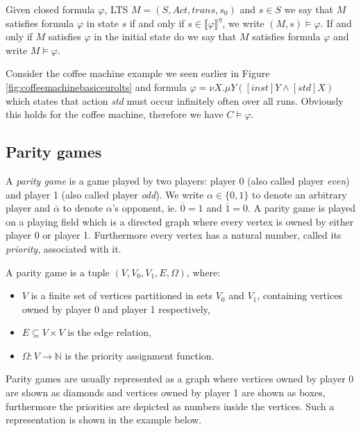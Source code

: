 Given closed formula $\varphi$, LTS $M = (S, Act, trans, s_0)$ and $s \in S$ we say that $M$ satisfies formula $\varphi$ in state $s$ if and only if $s \in \llbracket \varphi \rrbracket^\eta$, we write $(M,s) \models \varphi$. If and only if $M$ satisfies $\varphi$ in the initial state do we say that $M$ satisfies formula $\varphi$ and write $M \models \varphi$. 

\begin{example}
	Consider the coffee machine example we seen earlier in Figure \ref{fig:coffeemachinebasiceurolts} and formula $\varphi = \nu X. \mu Y([inst]Y \wedge [std]X)$ which states that action \textit{std} must occur infinitely often over all runs. Obviously this holds for the coffee machine, therefore we have $C \models \varphi$.
\end{example}

\subsection{Parity games}
A \textit{parity game} is a game played by two players: player 0 (also called player \textit{even}) and player 1 (also called player \textit{odd}). We write $\alpha \in \{0,1\}$ to denote an arbitrary player and $\overline{\alpha}$ to denote $\alpha$'s opponent, ie. $\overline{0} = 1$ and $\overline{1} = 0$. A parity game is played on a playing field which is a directed graph where every vertex is owned by either player 0 or player 1. Furthermore every vertex has a natural number, called its \textit{priority}, associated with it.
\begin{definition}
	\label{def_PG}
	A parity game is a tuple $(V, V_0, V_1, E, \Omega)$, where:
	\begin{itemize}
		\item $V$ is a finite set of vertices partitioned in sets $V_0$ and $V_1$, containing vertices owned by player 0 and player 1 respectively,
		\item $E \subseteq V \times V$ is the edge relation,
		\item $\Omega :  V \rightarrow \mathbb{N}$ is the priority assignment function.
	\end{itemize}
\end{definition}
Parity games are usually represented as a graph where vertices owned by player 0 are shown as diamonds and vertices owned by player 1 are shown as boxes, furthermore the priorities are depicted as numbers inside the vertices. Such a representation is shown in the example below.

